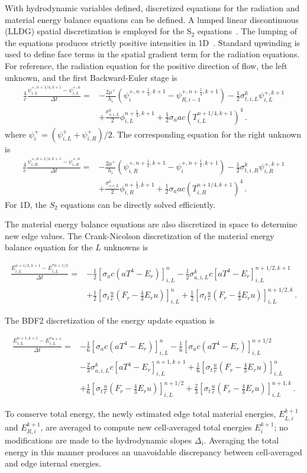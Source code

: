 \documentclass[preprint,12pt]{elsarticle}
\newcommand{\fn}[1]{\left( #1 \right)}
\newcommand{\pep}{\, .}
\newcommand{\lequ}[1]{\label{eq:#1}}
\newcommand{\half}{\frac{1}{2}}
\newcommand{\fourth}{\frac{1}{4}}
\newcommand{\sixth}{\frac{1}{6}}
\newcommand{\E}{{E_r}}
\newcommand{\F}{{F_r}}
\newcommand{\dt}{\Delta t}
\newcommand{\iL}{_{i,L}}
\newcommand{\iR}{_{i,R}}
\newcommand{\energyEmissionSource}{
   \left[\sigma_a c\left(aT^4 - \E\right)\right]
}
\newcommand{\energyEmissionSourceNew}{
   \sigma_{a,i,L}^k c\left[aT^4 - \E\right]
}
\newcommand{\energyDriftSource}{
   \left[\sigma_t\frac{u}{c}\left(\F-\frac{4}{3}\E u\right)\right]
}
\newcommand{\energyUpdateCN}[5]{
\begin{equation}\begin{split}
        \frac{E^{#4,k+1}#3-E^{*#4}#3}{#2\dt} = &
  -\half\energyEmissionSource^{#1}#3
  -\half\energyEmissionSourceNew^{#4,k+1}#3\\
  &+\half\energyDriftSource^{#1}#3
  +\half\energyDriftSource^{#4,k}#3
  \pep
#5
\end{split}\end{equation}
}
\newcommand{\energyUpdateBDFTwo}[6]{
    \begin{equation}\begin{split}
        \frac{E^{#5,k+1}#4-E^{*#5}#4}{#3\dt} = &
  -\sixth\energyEmissionSource^{#1}#4
  -\sixth\energyEmissionSource^{#2}#4\\
  &-\frac{2}{3}\energyEmissionSourceNew^{#5,k+1}#4
   +\sixth\energyDriftSource^{#1}#4\\
  &+\sixth\energyDriftSource^{#2}#4
  +\frac{2}{3}\energyDriftSource^{#5,k}#4
  \pep
#6
\end{split}\end{equation}
}
\begin{document}
With hydrodynamic variables defined, discretized equations for the radiation and material
energy balance equations can be defined.
A lumped linear discontinuous (LLDG) spatial discretization is employed
for the S$_2$ equations~\cite{???}.  The lumping of the equations produces strictly
positive intensities in
1D~\cite{???}. Standard upwinding is used to define face terms in the spatial gradient term for the radiation equations.  
For reference, the radiation equation for
the positive direction of flow, the left unknown, and the first Backward-Euler stage is
\begin{equation}
\lequ{S2BEfullL}\begin{split}
  \frac{4}{c}\frac{\psi\iL^{+,n+1/4,k+1}-\psi\iL^{+,n}}{\dt} = &
  -\frac{2\mu^+}{h_i}\fn{\psi^{+,n+\fourth,k+1}_i - \psi^{+,n+\fourth,k+1}_{R,i-1}}
   -\half\sigma_{t,i,L}^k\psi\iL^{+,k+1}\\
   & +\frac{\sigma_{s,i,L}^k}{2}\phi\iL^{n+\fourth,k+1} +\half\sigma_a a c
   \left(T_{i,L}^{n+1/4,k+1}\right)^4
   \pep
\end{split}
\end{equation}
where $\psi_{i}^+ = (\psi_{i,L}^+ + \psi_{i,R}^+)/2$.  The corresponding equation
for the right unknown is
\begin{equation}
    \lequ{S2BEfullR}\begin{split}
  \frac{4}{c}\frac{\psi\iR^{+,n+1/4,k+1}-\psi\iR^{+,n}}{\dt} = &
  -\frac{2\mu^+}{h_i}\fn{\psi^{+,n+\fourth,k+1}_{i,R} - \psi^{+,n+\fourth,k+1}_{i}}
   -\half\sigma_{t,i,R}^k\psi\iR^{+,k+1}\\
   & +\frac{\sigma_{s,i,L}^k}{2}\phi\iR^{n+\fourth,k+1} +\half\sigma_a a c
   \left(T_{i,R}^{n+1/4,k+1}\right)^4
   \pep
\end{split}
\end{equation}
For 1D, the $S_2$ equations can be
directly solved efficiently.     

The material energy balance equations are also discretized in space to determine new edge
values. 
The Crank-Nicolson discretization of the material energy balance equation for the $L$
unknowns is
\energyUpdateCN{n}{}{\iL}{n+1/2}{\lequ{hydroECNfull}}
The BDF2 discretization of the energy update equation is
\energyUpdateBDFTwo{n}{n+1/2}{}{\iL}{n+1}{\lequ{hydroEBDF2full}}
To conserve total energy, the newly estimated edge total
material energies, $E_{L,i}^{k+1}$ and $E_{R,i}^{k+1}$, are averaged to compute new
cell-averaged total energies $E_{i}^{k+1}$; no modifications are made to the hydrodynamic slopes
$\Delta_i$.  Averaging the total energy in this manner produces an unavoidable discrepancy between cell-averaged and edge
internal energies. 
\end{document}

